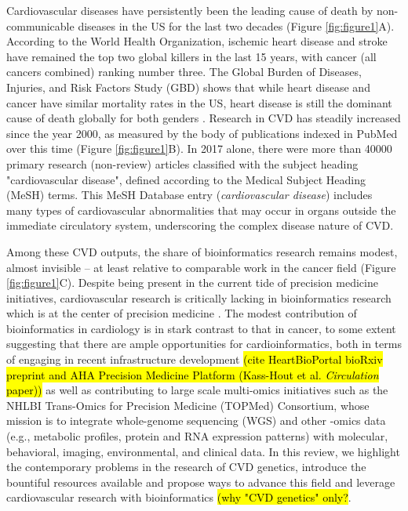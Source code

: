 \documentclass[letter]{bioinfo}
\begin{document}
Cardiovascular diseases have persistently been the leading cause of death by non-communicable diseases in the US for the last two decades (Figure \ref{fig:figure1}A).  According to the World Health Organization, ischemic heart disease and stroke have remained the top two global killers in the last 15 years, with cancer (all cancers combined) ranking number three.  The Global Burden of Diseases, Injuries, and Risk Factors Study (GBD) shows that while heart disease and cancer have similar mortality rates in the US, heart disease is still the dominant cause of death globally for both genders \citep{Roth:2018:Global}.  Research in CVD has steadily increased since the year 2000, as measured by the body of publications indexed in PubMed over this time (Figure \ref{fig:figure1}B).  In 2017 alone, there were more than 40000 primary research (non-review) articles classified with the subject heading "cardiovascular disease", defined according to the Medical Subject Heading (MeSH) terms.  This MeSH Database entry (\textit{cardiovascular disease}) includes many types of cardiovascular abnormalities that may occur in organs outside the immediate circulatory system, underscoring the complex disease nature of CVD.


Among these CVD outputs, the share of bioinformatics research remains modest, almost invisible -- at least relative to comparable work in the cancer field (Figure \ref{fig:figure1}C). Despite being present in the current tide of precision medicine initiatives, cardiovascular research is critically lacking in bioinformatics research which is at the center of precision medicine \citep{Gomez-Lopez:2017:Precision}.  The modest contribution of bioinformatics in cardiology is in stark contrast to that in cancer, to some extent suggesting that there are ample opportunities for cardioinformatics, both in terms of engaging in recent infrastructure development \hl{(cite HeartBioPortal bioRxiv preprint and AHA Precision Medicine Platform (Kass-Hout et al. \emph{Circulation} paper))} as well as contributing to large scale multi-omics initiatives such as the NHLBI Trans-Omics for Precision Medicine (TOPMed) Consortium, whose mission is to integrate whole-genome sequencing (WGS) and other -omics data (e.g., metabolic profiles, protein and RNA expression patterns) with molecular, behavioral, imaging, environmental, and clinical data.  In this review, we highlight the contemporary problems in the research of CVD genetics, introduce the bountiful resources available and propose ways to advance this field and leverage cardiovascular research with bioinformatics \hl{(why "CVD genetics" only?}.
\end{document}
